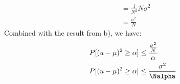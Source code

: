 \documentclass{article}
\begin{document}
\begin{enumerate}[a)]
\begin{equation}
\begin{split}
                &= \frac{1}{N^2} N\sigma^2  \\ %
                &= \frac{\sigma^2}{N}
            \end{split}
        \end{equation}
        Combined with the result from b), we have:
        \begin{equation}
            \begin{split}
                P[(u - \mu)^2 \geq \alpha] &\leq \frac{\frac{\sigma^2}{N}}{\alpha} \\
                P[(u - \mu)^2 \geq \alpha] &\leq \frac{\sigma^2}{\Nalpha}
            \end{split}
        \end{equation}
\end{enumerate}
\end{document}
